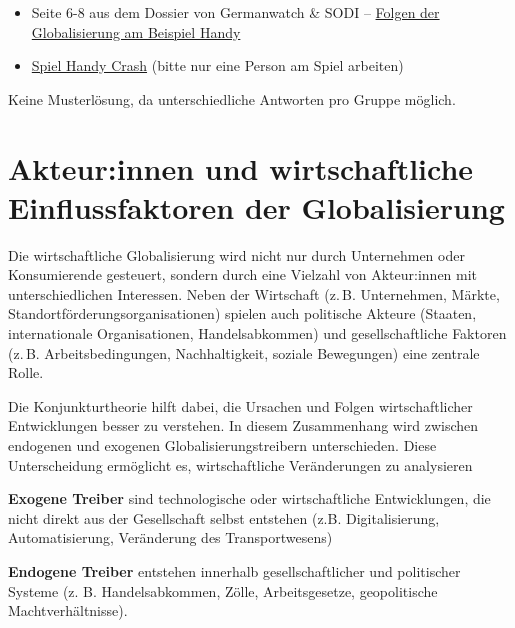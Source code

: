 \begin{myexercise}
\begin{textBox}[title=Hintergrund-Informationen und Recherche-Materialien]
\begin{itemize}
\begin{itemize}
                      \item Seite 6-8 aus dem Dossier von Germanwatch \& SODI -- \href{https://www.germanwatch.org/sites/default/files/publication/11036.pdf}{Folgen der Globalisierung am Beispiel Handy}
                      \item \href{https://www.handycrash.org/}{Spiel Handy Crash} (bitte nur eine Person am Spiel arbeiten)
                  \end{itemize}
        \end{itemize}
    \end{textBox}
    \begin{myanswer}
        Keine Musterlösung, da unterschiedliche Antworten pro Gruppe möglich.
    \end{myanswer}

\end{myexercise}

\chapter{Akteur:innen und wirtschaftliche Einflussfaktoren der Globalisierung}

Die wirtschaftliche Globalisierung wird nicht nur durch Unternehmen oder Konsumierende gesteuert, sondern durch eine Vielzahl von Akteur:innen mit unterschiedlichen Interessen. Neben der Wirtschaft (z. B. Unternehmen, Märkte, Standortförderungsorganisationen) spielen auch politische Akteure (Staaten, internationale Organisationen, Handelsabkommen) und gesellschaftliche Faktoren (z. B. Arbeitsbedingungen, Nachhaltigkeit, soziale Bewegungen) eine zentrale Rolle.

Die Konjunkturtheorie \cite{keynes1936general} hilft dabei, die Ursachen und Folgen wirtschaftlicher Entwicklungen besser zu verstehen. In diesem Zusammenhang wird zwischen endogenen und exogenen Globalisierungstreibern unterschieden. Diese Unterscheidung ermöglicht es, wirtschaftliche Veränderungen zu analysieren

\begin{mydefinition}
\item \textbf{Exogene Treiber} sind technologische oder wirtschaftliche Entwicklungen, die nicht direkt aus der Gesellschaft selbst entstehen (z.B. Digitalisierung, Automatisierung, Veränderung des Transportwesens)
\item \textbf{Endogene Treiber} entstehen innerhalb gesellschaftlicher und politischer Systeme (z. B. Handelsabkommen, Zölle, Arbeitsgesetze, geopolitische Machtverhältnisse).
\end{mydefinition}


